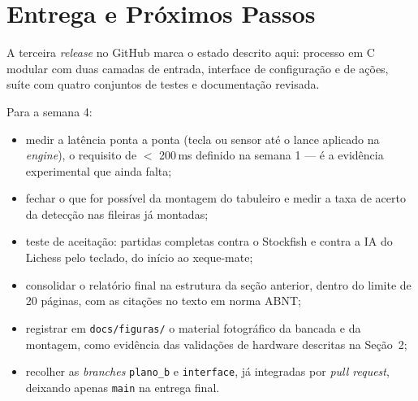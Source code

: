 \documentclass[12pt,a4paper]{article}
\begin{document}
\section{Entrega e Próximos Passos}

A terceira \emph{release} no GitHub marca o estado descrito aqui: processo em C
modular com duas camadas de entrada, interface de configuração e de ações,
suíte com quatro conjuntos de testes e documentação revisada.

Para a semana 4:

\begin{itemize}
  \item medir a latência ponta a ponta (tecla ou sensor até o lance aplicado na
        \emph{engine}), o requisito de $<$ 200\,ms definido na semana 1 --- é a
        evidência experimental que ainda falta;
  \item fechar o que for possível da montagem do tabuleiro e medir a taxa de
        acerto da detecção nas fileiras já montadas;
  \item teste de aceitação: partidas completas contra o Stockfish e contra a IA
        do Lichess pelo teclado, do início ao xeque-mate;
  \item consolidar o relatório final na estrutura da seção anterior, dentro do
        limite de 20 páginas, com as citações no texto em norma ABNT;
  \item registrar em \texttt{docs/figuras/} o material fotográfico da bancada e
        da montagem, como evidência das validações de hardware descritas na
        Seção~2;
  \item recolher as \emph{branches} \texttt{plano\_b} e \texttt{interface}, já
        integradas por \emph{pull request}, deixando apenas \texttt{main} na
        entrega final.
\end{itemize}
\end{document}
